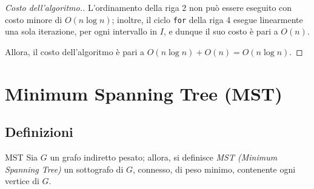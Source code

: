 \documentclass[a4paper, 12pt]{report}
\begin{document}
    \begin{proof}[Costo dell'algoritmo.]
        L'ordinamento della riga 2 non può essere eseguito con costo minore di $O(n \log n)$; inoltre, il ciclo \texttt{for} della riga 4 esegue linearmente una sola iterazione, per ogni intervallo in $I$, e dunque il suo costo è pari a $O(n)$.

        Allora, il costo dell'algoritmo è pari a $O(n \log n) + O(n) = O(n \log n)$.
    \end{proof}

    \section{Minimum Spanning Tree (MST)}

    \subsection{Definizioni}

    \begin{frameddefn}{MST}
        Sia $G$ un grafo indiretto pesato; allora, si definisce \textit{MST (Minimum Spanning Tree)} un sottografo di $G$, connesso, di peso minimo, contenente ogni vertice di $G$.
    \end{frameddefn}
\end{document}
